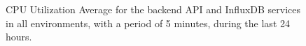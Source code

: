 \begin{figure}[!htbp]
    \centering
    \caption[AWS ECS Advanced Monitoring Example 2]{CPU Utilization Average for the backend API and InfluxDB services in all environments, with a period of 5 minutes, during the last 24 hours.}
    \label{fig:ecs-example-02}
\end{figure} 
    